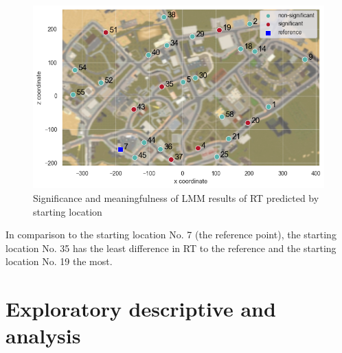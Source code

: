 \begin{figure}[h]
	\centering
	\includegraphics[width=150mm]{figures/significance_starting_locations_RT_map_23.png}
	\caption[Significance and meaningfulness (RT predicted by starting location)]{Significance and meaningfulness of LMM results of RT predicted by starting location}
	\label{fig:sig_RT_loc_map}
\end{figure}

In comparison to the starting location No. 7 (the reference point), the starting location No. 35 has the least difference in RT to the reference and the starting location No. 19 the most.

\section{Exploratory descriptive and analysis}
